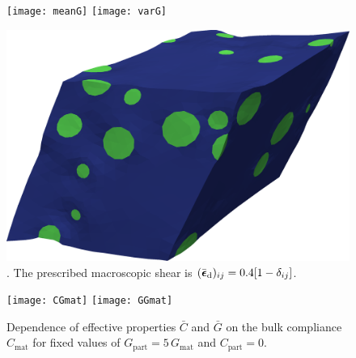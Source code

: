 \documentclass{bmcart}
\renewcommand{\dev}{\mathrm{d}}
\begin{document}
\begin{backmatter}
\begin{figure}[htb]
\centering
\texttt{[image: meanG]}
\texttt{[image: varG]}
\caption{}
\label{fig:SVE_comp}
\end{figure}

\begin{figure}[htb]
\centering
 \includegraphics[width=0.5\linewidth]{rve6_def.png}
\caption{. The prescribed macroscopic shear is $(\bar{\ts\epsilon}_\dev)_{ij} = 0.4[1 - \delta_{ij}]$.}
\label{fig:def_rve6}
\end{figure}

\begin{figure}[htbp!]
\centering
\texttt{[image: CGmat]}
\texttt{[image: GGmat]}
\caption{
Dependence of effective properties $\bar{C}$ and $\bar{G}$ on the bulk compliance $C_\mathrm{mat}$ for fixed values of $G_\mathrm{part} = 5\,G_\mathrm{mat}$ and $C_\mathrm{part} = 0$.}
\label{fig:RVE_compressibility}
\end{figure}




\end{backmatter}
\end{document}
